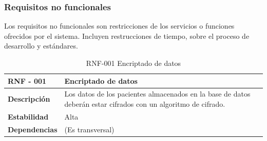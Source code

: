 \subsubsection{Requisitos no funcionales}


Los requisitos no funcionales son restricciones de los servicios o funciones ofrecidos por el sistema. Incluyen restrucciones de tiempo, sobre el proceso de desarrollo y estándares\cite{sommerville}.

\begin{table}[htpb]
\centering
\begin{tabularx}{\textwidth}{|l|X|}
\hline
\rowcolor[gray]{0.9}\textbf{RNF - 001}                               & \textbf{Encriptado de datos}                                                                                            \\ \hline
\textbf{Descripción}                             & Los datos de los pacientes almacenados en la base de datos deberán estar cifrados con un algoritmo de cifrado. \\ \hline
\textbf{Estabilidad}                             & Alta                                                                                                           \\ \hline
\textbf{Dependencias} & (Es transversal)                                                                                               \\ \hline
\end{tabularx}
\caption{RNF-001 Encriptado de datos}                                                                                                                                                                                                                                                                      
\end{table}

\clearpage

